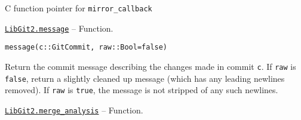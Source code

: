 \begin{adjustwidth}{2em}{0pt}

C function pointer for \texttt{mirror\_callback}



\end{adjustwidth}
\hypertarget{8348936587496719270}{} 
\hyperlink{8348936587496719270}{\texttt{LibGit2.message}}  -- {Function.}

\begin{adjustwidth}{2em}{0pt}


\begin{verbatim}
message(c::GitCommit, raw::Bool=false)
\end{verbatim}

Return the commit message describing the changes made in commit \texttt{c}. If \texttt{raw} is \texttt{false}, return a slightly {\textquotedbl}cleaned up{\textquotedbl} message (which has any leading newlines removed). If \texttt{raw} is \texttt{true}, the message is not stripped of any such newlines.



\end{adjustwidth}
\hypertarget{8167742111561542209}{} 
\hyperlink{8167742111561542209}{\texttt{LibGit2.merge\_analysis}}  -- {Function.}

